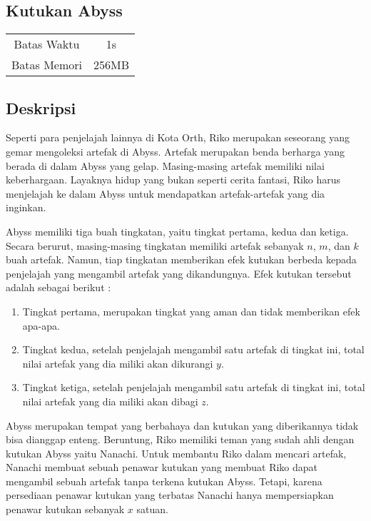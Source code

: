 \documentclass{article}
\begin{document}
\begin{center}

    
    \section*{Kutukan Abyss} %

    \begin{tabular}{ | c c | }
        \hline
        Batas Waktu  & 1s \\    %
        Batas Memori & 256MB \\  %
        \hline
    \end{tabular}
\end{center}

\subsection*{Deskripsi}

Seperti para penjelajah lainnya di Kota Orth, Riko merupakan seseorang yang gemar mengoleksi artefak di Abyss. 
Artefak merupakan benda berharga yang berada di dalam Abyss yang gelap. Masing-masing artefak memiliki nilai keberhargaan.
Layaknya hidup yang bukan seperti cerita fantasi, Riko harus menjelajah ke dalam Abyss untuk mendapatkan artefak-artefak yang dia inginkan.

Abyss memiliki tiga buah tingkatan, yaitu tingkat pertama, kedua dan ketiga. Secara berurut, masing-masing tingkatan memiliki artefak sebanyak $n$, $m$, dan $k$ buah artefak. Namun, tiap tingkatan memberikan efek kutukan berbeda kepada penjelajah yang mengambil artefak yang dikandungnya. 
Efek kutukan tersebut adalah sebagai berikut :
\begin{enumerate}
    \setlength\itemsep{0pt}
    \item Tingkat pertama, merupakan tingkat yang aman dan tidak memberikan efek apa-apa.
    \item Tingkat kedua, setelah penjelajah mengambil satu artefak di tingkat ini, total nilai artefak yang dia miliki akan dikurangi $y$.
    \item Tingkat ketiga, setelah penjelajah mengambil satu artefak di tingkat ini, total nilai artefak yang dia miliki akan dibagi $z$.
\end{enumerate}
Abyss merupakan tempat yang berbahaya dan kutukan yang diberikannya tidak bisa dianggap enteng. Beruntung, Riko memiliki teman yang sudah
ahli dengan kutukan Abyss yaitu Nanachi. Untuk membantu Riko dalam mencari artefak, Nanachi membuat sebuah penawar kutukan yang membuat 
Riko dapat mengambil sebuah artefak tanpa terkena kutukan Abyss. Tetapi, karena persediaan penawar kutukan yang terbatas Nanachi hanya 
mempersiapkan penawar kutukan sebanyak $x$ satuan.
\end{document}
